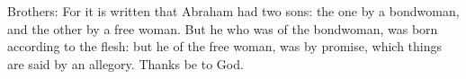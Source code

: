 Brothers: For it is written that Abraham had two sons: the one by a bondwoman, and the other by a free woman. But he who was of the bondwoman, was born according to the flesh: but he of the free woman, was by promise, which things are said by an allegory. \rubric{\Rbar} Thanks be to God.